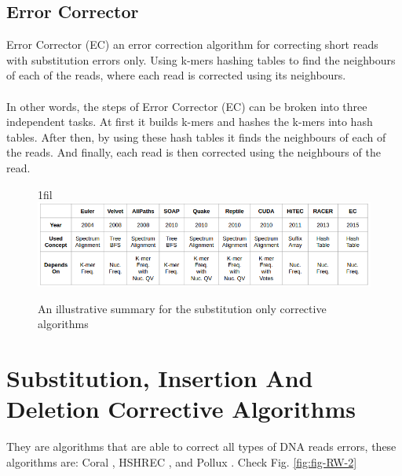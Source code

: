 \documentclass[12pt,openany]{llncs}
\makeatletter
\newcommand*{\centerfloat}{%
  \parindent \z@
  \leftskip \z@ \@plus 1fil \@minus \textwidth
  \rightskip\leftskip
  \parfillskip \z@skip}
\makeatother
\begin{document}
\subsection{Error Corrector}
Error Corrector (EC) \cite{EC} an error correction algorithm for correcting short reads with substitution errors only. Using k-mers hashing tables to find the neighbours of each of the reads, where each read is corrected using its neighbours.
\\
\\
In other words, the steps of Error Corrector (EC) can be broken into three independent tasks. At first it builds k-mers and hashes the k-mers into hash tables. After then, by using these hash tables it finds the neighbours of each of the reads. And finally, each read is then corrected using the neighbours of the read.

\begin{figure}
	\centerfloat
	\includegraphics[width=1.35\linewidth]{./figs/RW-1}
	\caption{\label{fig:fig-RW-1}An illustrative summary for the substitution only corrective algorithms}
\end{figure}


\section{Substitution, Insertion And Deletion Corrective Algorithms}
They are algorithms that are able to correct all types of DNA reads errors, these algorithms are: Coral \cite{Coral}, HSHREC \cite{HShrec}, and Pollux \cite{Pollux}. Check Fig. \ref{fig:fig-RW-2}
\end{document}
